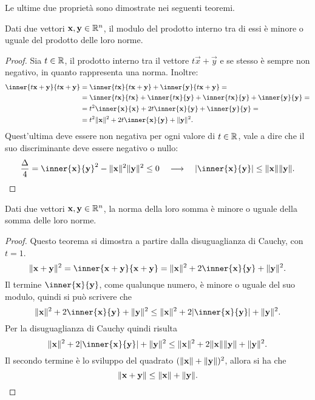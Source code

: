 Le ultime due proprietà sono dimostrate nei seguenti teoremi.
\begin{teorema} \label{t:cauchy-schwarz}
Dati due vettori $\mathbf{x}, \mathbf{y}\in\mathbb{R}^n$, il modulo del prodotto interno tra di essi è minore o uguale del prodotto delle loro norme.
\end{teorema}
\begin{proof}
Sia $t\in\mathbb{R}$, il prodotto interno tra il vettore $t\vec x+\vec y$ e se stesso è sempre non negativo, in quanto rappresenta una norma. Inoltre:
\begin{align*}
	\inner{t\vec x+\vec y}{t\vec x+\vec y}
	&=\inner{t\vec x}{t\vec x+\vec y}+\inner{\vec y}{t\vec x+\vec y}=\\
	&=\inner{t\vec x}{t\vec x}+\inner{t\vec x}{\vec y}+\inner{t\vec x}{\vec y}+\inner{\vec y}{\vec y}=\\
	&=t^2\inner{\vec x}{\vec x}+2t\inner{\vec x}{\vec y}+\inner{\vec y}{\vec y}=\\
	&=t^2\norm{\vec x}^2+2t\inner{\vec x}{\vec y}+\norm{\vec y}^2.
\end{align*}
Quest'ultima deve essere non negativa per ogni valore di $t\in\mathbb{R}$, vale a dire che il suo discriminante deve essere negativo o nullo:
\begin{equation}
	\frac{\Delta}{4}=\inner{\vec x}{\vec y}^2-\norm{\vec x}^2\norm{\vec y}^2\leq 0\qqq
	\abs{\inner{\vec x}{\vec y}}\leq\norm{\vec x}\norm{\vec y}.\qedhere
\end{equation}
\end{proof}
\begin{teorema} \label{t:disuguaglianza-triangolare}
Dati due vettori $\mathbf{x}, \mathbf{y}\in\mathbb{R}^n$, la norma della loro somma è minore o uguale della somma delle loro norme.
\end{teorema}
\begin{proof}
Questo teorema si dimostra a partire dalla disuguaglianza di Cauchy, con $t=1$.
\[
	\norm{\vec x+\vec y}^2=\inner{\vec x+\vec y}{\vec x+\vec y}=\norm{\vec x}^2+2\inner{\vec x}{\vec y}+\norm{\vec y}^2.
\]
Il termine $\inner{\vec x}{\vec y}$, come qualunque numero, è minore o uguale del suo modulo, quindi si può scrivere che
\[
	\norm{\vec x}^2+2\inner{\vec x}{\vec y}+\norm{\vec y}^2\leq\norm{\vec x}^2+2\abs{\inner{\vec x}{\vec y}}+\norm{\vec y}^2.
\]
Per la disuguaglianza di Cauchy quindi risulta
\[
	\norm{\vec x}^2+2\abs{\inner{\vec x}{\vec y}}+\norm{\vec y}^2\leq\norm{\vec x}^2+2\norm{\vec x}\norm{\vec y}+\norm{\vec y}^2.
\]
Il secondo termine è lo sviluppo del quadrato $(\lVert\mathbf{x}\rVert+\lVert\mathbf{y}\rVert)^2$, allora si ha che
\[
\lVert\mathbf{x}+\mathbf{y}\rVert\leq\lVert\mathbf{x}\rVert+\lVert\mathbf{y}\rVert.\qedhere
\]
\end{proof}

